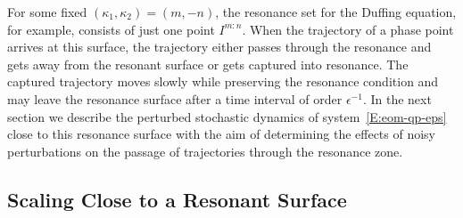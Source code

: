 For some fixed $(\kappa_1,\kappa_2) = (m,-n)$, the resonance set for the Duffing equation, for example, consists of just one point $I^{m:n}$. When the trajectory of a phase point arrives at this surface, the trajectory either passes through the resonance and gets away from the resonant surface or gets captured into resonance. The captured trajectory moves slowly while preserving the resonance condition and may leave the resonance surface after a time interval of order $\epsilon^{-1}$. In the next section we describe the perturbed stochastic dynamics of system~\eqref{E:eom-qp-eps} close to this resonance surface with the aim of determining the effects of noisy perturbations on the passage of trajectories through the resonance zone.

\subsection{Scaling Close to a Resonant Surface}
\label{S:scaling}


